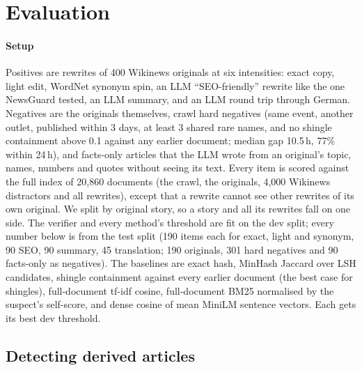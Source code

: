 \documentclass[11pt,a4paper]{article}
\begin{document}
\section{Evaluation}
\label{sec:eval}

\paragraph{Setup} Positives are rewrites of 400 Wikinews originals at six intensities: exact copy, light edit, WordNet synonym spin, an LLM ``SEO-friendly'' rewrite like the one NewsGuard tested, an LLM summary, and an LLM round trip through German. Negatives are the originals themselves, crawl hard negatives (same event, another outlet, published within 3 days, at least 3 shared rare names, and no shingle containment above 0.1 against any earlier document; median gap 10.5\,h, 77\% within 24\,h), and facts-only articles that the LLM wrote from an original's topic, names, numbers and quotes without seeing its text. Every item is scored against the full index of 20,860 documents (the crawl, the originals, 4,000 Wikinews distractors and all rewrites), except that a rewrite cannot see other rewrites of its own original. We split by original story, so a story and all its rewrites fall on one side. The verifier and every method's threshold are fit on the dev split; every number below is from the test split (190 items each for exact, light and synonym, 90 SEO, 90 summary, 45 translation; 190 originals, 301 hard negatives and 90 facts-only as negatives). The baselines are exact hash, MinHash Jaccard over LSH candidates, shingle containment against every earlier document (the best case for shingles), full-document tf-idf cosine, full-document BM25 normalised by the suspect's self-score, and dense cosine of mean MiniLM sentence vectors. Each gets its best dev threshold.

\subsection{Detecting derived articles}
\end{document}
